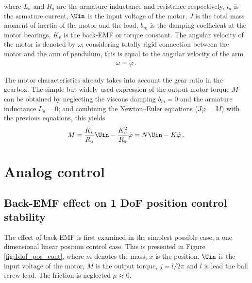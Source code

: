 \noindent where  $L_a$ and $R_a$ are the armature inductance and resistance respectively, $i_a$ is the armature current, $\Uin$ is the input voltage of the motor, $J$ is the total mass moment of inertia of the motor and the load, $b_m$ is the damping coefficient at the motor bearings, $K_v$ is the back-EMF or torque constant. The angular velocity of the motor is denoted by $\omega$; considering totally rigid connection between the motor and the arm of pendulum, this is equal to the angular velocity of the arm 
\begin{align}
	\omega = \dot \varphi\,.
\end{align}

The motor characteristics already takes into account the gear ratio in  the gearbox.
The simple but widely used expression of the output motor torque $M$ can be obtained by neglecting the viscous damping $b_m=0$ and the armature inductance $L_a = 0$; and combining the Newton--Euler equations ($J \ddot \varphi = M$) with the previous equations, this yields
\begin{align}
	M = \dfrac{K_v}{R_a}\Uin - \dfrac{K_{v}^{2}}{R_a} \dot \varphi = N \Uin - K \dot \varphi\,. \label{eq:electic_motor}
\end{align}



\section{Analog control}


\subsection{Back-EMF effect on 1 DoF position control stability}

The effect of back-EMF is first examined in the simplest possible case, a one dimensional linear position control case. This is presented in Figure \ref{fig:1dof_pos_cont}, where $m$ denotes the mass, $x$ is the position, $\Uin$ is the input voltage of the motor, $M$ is the output torque, $j = l/2\pi$ and $l$ is lead the ball screw lead. The friction is neglected $\mu\approx 0$.


